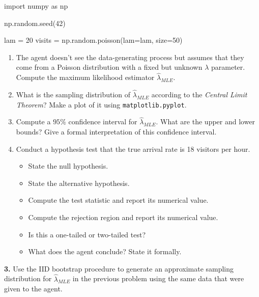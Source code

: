 \documentclass[
  letterpaper,
  DIV=11,
  numbers=noendperiod]{scrreprt}
\newenvironment{Shaded}{\begin{snugshade}}{\end{snugshade}}
\newcommand{\DecValTok}[1]{\textcolor[rgb]{0.68,0.00,0.00}{#1}}
\newcommand{\ImportTok}[1]{\textcolor[rgb]{0.00,0.46,0.62}{#1}}
\newcommand{\NormalTok}[1]{\textcolor[rgb]{0.00,0.23,0.31}{#1}}
\newcommand{\OperatorTok}[1]{\textcolor[rgb]{0.37,0.37,0.37}{#1}}
\providecommand{\tightlist}{%
  \setlength{\itemsep}{0pt}\setlength{\parskip}{0pt}}\usepackage{longtable,booktabs,array}
\begin{document}
\begin{Shaded}
\begin{Highlighting}[]
\ImportTok{import}\NormalTok{ numpy }\ImportTok{as}\NormalTok{ np}

\NormalTok{np.random.seed(}\DecValTok{42}\NormalTok{)}

\NormalTok{lam }\OperatorTok{=} \DecValTok{20}
\NormalTok{visits }\OperatorTok{=}\NormalTok{ np.random.poisson(lam}\OperatorTok{=}\NormalTok{lam, size}\OperatorTok{=}\DecValTok{50}\NormalTok{)}
\end{Highlighting}
\end{Shaded}

\begin{enumerate}
\def\labelenumi{\alph{enumi}.}
\setcounter{enumi}{1}
\item
  The agent doesn't see the data-generating process but assumes that
  they come from a Poisson distribution with a fixed but unknown
  \(\lambda\) parameter. Compute the maximum likelihood estimator
  \(\hat{\lambda}_{MLE}\).
\item
  What is the sampling distribution of \(\hat{\lambda}_{MLE}\) according
  to the \emph{Central Limit Theorem}? Make a plot of it using
  \texttt{matplotlib.pyplot}.
\item
  Compute a \(95\%\) confidence interval for \(\hat{\lambda}_{MLE}\).
  What are the upper and lower bounds? Give a formal interpretation of
  this confidence interval.
\item
  Conduct a hypothesis test that the true arrival rate is 18 visitors
  per hour.

  \begin{itemize}
  \tightlist
  \item
    State the null hypothesis.
  \item
    State the alternative hypothesis.
  \item
    Compute the test statistic and report its numerical value.
  \item
    Compute the rejection region and report its numerical value.
  \item
    Is this a one-tailed or two-tailed test?
  \item
    What does the agent conclude? State it formally.
  \end{itemize}
\end{enumerate}

\textbf{3.} Use the IID bootstrap procedure to generate an approximate
sampling distribution for \(\hat{\lambda}_{MLE}\) in the previous
problem using the same data that were given to the agent.
\end{document}
